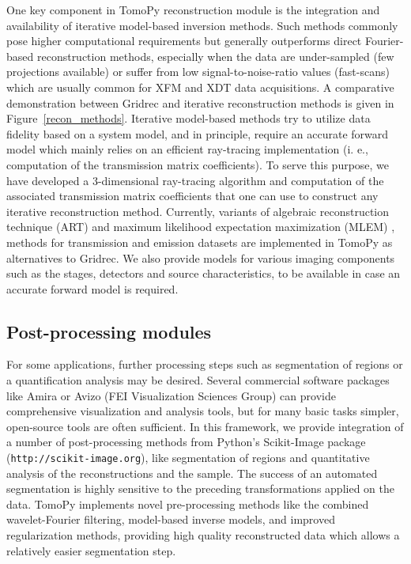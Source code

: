 \documentclass[pdf]{iucr}              %
\begin{document}
One key component in TomoPy reconstruction module is the integration and availability of iterative model-based inversion methods. Such methods commonly pose higher computational requirements but generally outperforms direct Fourier-based reconstruction methods, especially when the data are under-sampled (few projections available) or suffer from low signal-to-noise-ratio values (fast-scans) which are usually common for XFM and XDT data acquisitions. A comparative demonstration between Gridrec and iterative reconstruction methods is given in Figure~\ref{recon_methods}. Iterative model-based methods try to utilize data fidelity based on a system model, and in principle, require an accurate forward model which mainly relies on an efficient ray-tracing implementation (i. e., computation of the transmission matrix coefficients). To serve this purpose, we have developed a 3-dimensional ray-tracing algorithm and computation of the associated transmission matrix coefficients that one can use to construct any iterative reconstruction method. Currently, variants of algebraic reconstruction technique (ART) \cite{Gordon1970}  and maximum likelihood expectation maximization (MLEM) \cite{Dempster1977}, \cite{lange1997} methods for transmission and emission datasets are implemented in TomoPy as alternatives to Gridrec. We also provide models for various imaging components such as the stages, detectors and source characteristics, to be available in case an accurate forward model is required. 

\subsection{Post-processing modules}

For some applications, further processing steps such as segmentation of regions or a quantification analysis may be desired. Several commercial software packages like Amira or Avizo (FEI Visualization Sciences Group) can provide comprehensive visualization and analysis tools, but for many basic tasks simpler, open-source tools are often sufficient. In this framework, we provide integration of a number of post-processing methods from Python's Scikit-Image package (\texttt{http://scikit-image.org}), like segmentation of regions and quantitative analysis of the reconstructions and the sample. The success of an automated segmentation is highly sensitive to the preceding transformations applied on the data. TomoPy implements novel pre-processing methods like the combined wavelet-Fourier filtering, model-based inverse models, and improved regularization methods, providing high quality reconstructed data which allows a relatively easier segmentation step.  
\end{document}
